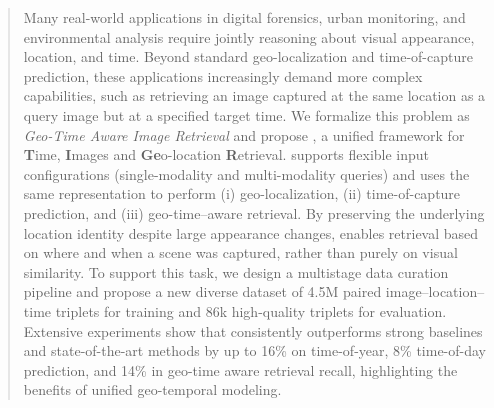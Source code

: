 \begin{abstract}

Many real-world applications in digital forensics, urban monitoring, and environmental analysis require jointly reasoning about visual appearance, location, and time. Beyond standard geo-localization and time-of-capture prediction, these applications increasingly demand more complex capabilities, such as retrieving an image captured at the same location as a query image but at a specified target time. We formalize this problem as \emph{Geo-Time Aware Image Retrieval} and propose \tiger, a unified framework for \textbf{T}ime, \textbf{I}mages and \textbf{Ge}o-location \textbf{R}etrieval. \tiger supports flexible input configurations (single-modality and multi-modality queries) and uses the same representation to perform (i) geo-localization, (ii) time-of-capture prediction, and (iii) geo-time–aware retrieval. By preserving the underlying location identity despite large appearance changes, \tiger enables retrieval based on where and when a scene was captured, rather than purely on visual similarity. To support this task, we design a multistage data curation pipeline and propose a new diverse dataset of 4.5M paired image–location–time triplets for training and 86k high-quality triplets for evaluation. Extensive experiments show that \tiger consistently outperforms strong baselines and state-of-the-art methods by up to 16\% on time-of-year, 8\% time-of-day prediction, and 14\% in geo-time aware retrieval recall, highlighting the benefits of unified geo-temporal modeling.

\end{abstract}

